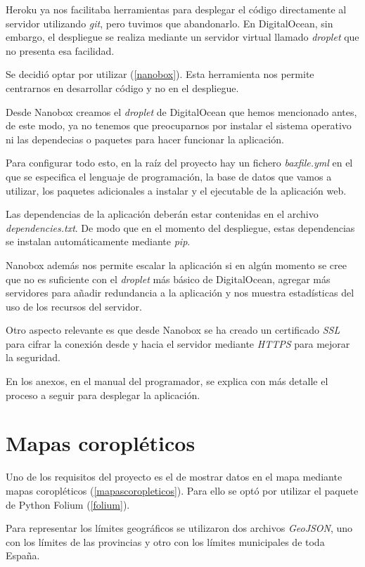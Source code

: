 Heroku ya nos facilitaba herramientas para desplegar el código directamente al servidor utilizando \textit{git}, pero tuvimos que abandonarlo. En \mbox{DigitalOcean}, sin embargo, el despliegue se realiza mediante un servidor virtual llamado \textit{droplet} que no presenta esa facilidad.

Se decidió optar por utilizar  (\ref{nanobox}). Esta herramienta nos permite centrarnos en desarrollar código y no en el despliegue.

Desde Nanobox creamos el \textit{droplet} de DigitalOcean que hemos mencionado antes, de este modo, ya no tenemos que preocuparnos por instalar el sistema operativo ni las dependecias o paquetes para hacer funcionar la aplicación.

Para configurar todo esto, en la raíz del proyecto hay un fichero \textit{baxfile.yml} en el que se especifica el lenguaje de programación, la base de datos que vamos a utilizar, los paquetes adicionales a instalar y el ejecutable de la aplicación web.

Las dependencias de la aplicación deberán estar contenidas en el archivo \textit{dependencies.txt}. De modo que en el momento del despliegue, estas dependencias se instalan automáticamente mediante \textit{pip}.

Nanobox además nos permite escalar la aplicación si en algún momento se cree que no es suficiente con el \textit{droplet} más básico de DigitalOcean, agregar más servidores para añadir redundancia a la aplicación y nos muestra estadísticas del uso de los recursos del servidor.

Otro aspecto relevante es que desde Nanobox se ha creado un certificado \textit{SSL} para cifrar la conexión  desde y hacia el servidor mediante \textit{HTTPS} para mejorar la seguridad.

En los anexos, en el manual del programador, se explica con más detalle el proceso a seguir para desplegar la aplicación.

\section{Mapas coropléticos}

Uno de los requisitos del proyecto es el de mostrar datos en el mapa mediante mapas coropléticos (\ref{mapascoropleticos}). Para ello se optó por utilizar el paquete de Python Folium (\ref{folium}).

Para representar los límites geográficos se utilizaron dos archivos \textit{GeoJSON}, uno con los límites de las provincias y otro con los límites municipales de toda España.


